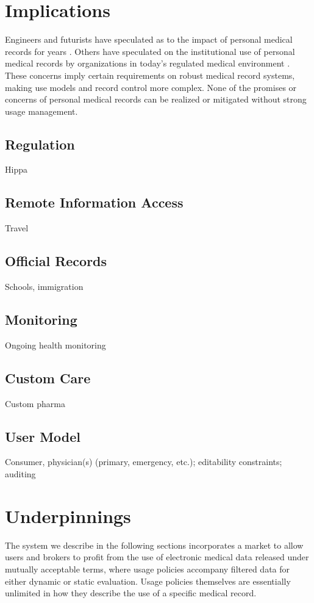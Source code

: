 \documentclass[10pt, conference, compsocconf]{IEEEtran}
\begin{document}
\section*{Implications}
Engineers and futurists have speculated as to the impact of personal medical records for years \cite{Emr:Web:BestCaseEMR,Emr:Web:WorstCaseEMR}.  Others have speculated on the institutional use of personal medical records by organizations in today's regulated medical environment \cite{Emr:doi:10.1056/NEJMc081118}.  These concerns imply certain requirements on robust medical record systems, making use models and record control more complex.  None of the promises or concerns of personal medical records can be realized or mitigated without strong usage management.

\subsection*{Regulation}
Hippa

\subsection*{Remote Information Access}
Travel

\subsection*{Official Records}
Schools, immigration

\subsection*{Monitoring}
Ongoing health monitoring

\subsection*{Custom Care}
Custom pharma

\subsection*{User Model}
Consumer, physician(s) (primary, emergency, etc.); editability constraints; auditing

\section*{Underpinnings}
The system we describe in the following sections incorporates a market to allow users and brokers to profit from the use of electronic medical data released under mutually acceptable terms, where usage policies accompany filtered data for either dynamic or static evaluation.  Usage policies themselves are essentially unlimited in how they describe the use of a specific medical record.
\end{document}
